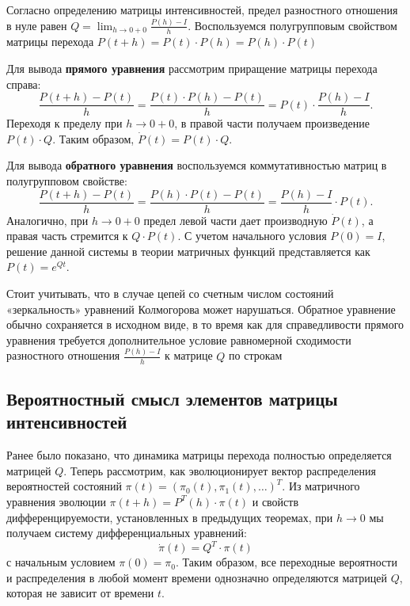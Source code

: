 \begin{tproof}
    Согласно определению матрицы интенсивностей, предел разностного отношения в нуле равен $Q = \lim_{h \to 0+0} \frac{P(h) - I}{h}$. Воспользуемся полугрупповым свойством матрицы перехода $P(t + h) = P(t) \cdot P(h) = P(h) \cdot P(t)$ %
    
    Для вывода \textbf{прямого уравнения} рассмотрим приращение матрицы перехода справа:
    \[
    \dfrac{P(t + h) - P(t)}{h} = \dfrac{P(t) \cdot P(h) - P(t)}{h} = P(t) \cdot \dfrac{P(h) - I}{h}.
    \]
    Переходя к пределу при $h \to 0+0$, в правой части получаем произведение $P(t) \cdot Q$. Таким образом, $\dot{P}(t) = P(t) \cdot Q$.
    
    Для вывода \textbf{обратного уравнения} воспользуемся коммутативностью матриц в полугрупповом свойстве:
    \[
    \dfrac{P(t + h) - P(t)}{h} = \dfrac{P(h) \cdot P(t) - P(t)}{h} = \dfrac{P(h) - I}{h} \cdot P(t).
    \]
    Аналогично, при $h \to 0+0$ предел левой части дает производную $\dot{P}(t)$, а правая часть стремится к $Q \cdot P(t)$. С учетом начального условия $P(0) = I$, решение данной системы в теории матричных функций представляется как $P(t) = e^{Qt}$. %
\end{tproof}

\begin{note}
    Стоит учитывать, что в случае цепей со счетным числом состояний «зеркальность» уравнений Колмогорова может нарушаться. Обратное уравнение обычно сохраняется в исходном виде, в то время как для справедливости прямого уравнения требуется дополнительное условие равномерной сходимости разностного отношения $\frac{P(h) - I}{h}$ к матрице $Q$ по строкам %
\end{note}

\subsection{Вероятностный смысл элементов матрицы интенсивностей}

Ранее было показано, что динамика матрицы перехода полностью определяется матрицей $Q$. Теперь рассмотрим, как эволюционирует вектор распределения вероятностей состояний $\pi(t) = (\pi_0(t), \pi_1(t), \dots)^T$. Из матричного уравнения эволюции $\pi(t+h) = P^T(h) \cdot \pi(t)$ и свойств дифференцируемости, установленных в предыдущих теоремах, при $h \to 0$ мы получаем систему дифференциальных уравнений:
\[
    \dot{\pi}(t) = Q^T \cdot \pi(t)
\]
с начальным условием $\pi(0) = \pi_0$. Таким образом, все переходные вероятности и распределения в любой момент времени однозначно определяются матрицей $Q$, которая не зависит от времени $t$.

